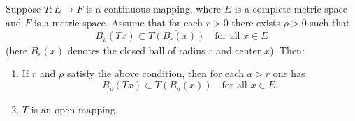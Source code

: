 Suppose $T: E \to F$ is a continuous mapping, where $E$ is a complete metric space and $F$ is a metric space. Assume that for each $r > 0$ there exists $\rho > 0$ such that
$$
B_\rho(Tx) \subset \overline{T(B_r(x))} \quad \text{for all } x \in E
$$
(here $B_r(x)$ denotes the closed ball of radius $r$ and center $x$). Then:
\begin{enumerate}
\item[(i)] If $r$ and $\rho$ satisfy the above condition, then for each $a > r$ one has
$$
B_\rho(Tx) \subset T(B_a(x)) \quad \text{for all } x \in E.
$$
\item[(ii)] $T$ is an open mapping.
\end{enumerate}

